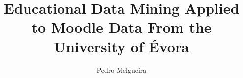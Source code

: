 \documentclass{beamer}
\title[]
{Educational Data Mining Applied to Moodle Data From the University of Évora}
\subtitle{}
\author[]
{Pedro Melgueira}
\institute[]{Universidade de Évora}
\begin{document}
\frame{\titlepage}







\end{document}
